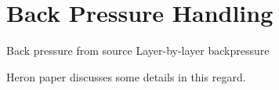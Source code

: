 \section{Back Pressure Handling}

Back pressure from source
Layer-by-layer backpressure

Heron paper discusses some details in this regard.